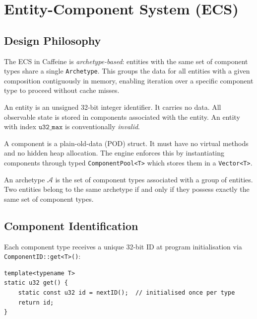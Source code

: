 \chapter{Entity-Component System (ECS)}

\section{Design Philosophy}

The ECS in Caffeine is \emph{archetype-based}: entities with the same
set of component types share a single \texttt{Archetype}. This groups
the data for all entities with a given composition contiguously in memory,
enabling iteration over a specific component type to proceed without cache
misses.

\begin{definition}[Entity]
An entity is an unsigned 32-bit integer identifier. It carries no data.
All observable state is stored in components associated with the entity.
An entity with index $\texttt{u32\_max}$ is conventionally \emph{invalid}.
\end{definition}

\begin{definition}[Component]
A component is a plain-old-data (POD) struct. It must have no virtual
methods and no hidden heap allocation. The engine enforces this by
instantiating components through typed \texttt{ComponentPool<T>} which
stores them in a \texttt{Vector<T>}.
\end{definition}

\begin{definition}[Archetype]
An archetype $\mathcal{A}$ is the set of component types associated with a
group of entities. Two entities belong to the same archetype if and only if
they possess exactly the same set of component types.
\end{definition}

\section{Component Identification}

Each component type receives a unique 32-bit ID at program initialisation
via \texttt{ComponentID::get<T>()}:

\begin{lstlisting}[caption={Type-ID registration}]
template<typename T>
static u32 get() {
    static const u32 id = nextID();  // initialised once per type
    return id;
}
\end{lstlisting}

